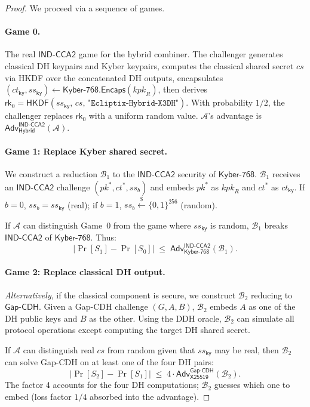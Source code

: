 \documentclass[11pt,a4paper]{article}
\theoremstyle{definition}
\theoremstyle{remark}
\newcommand{\adv}{\mathsf{Adv}}
\newcommand{\advA}{\mathcal{A}}
\newcommand{\advB}{\mathcal{B}}
\newcommand{\HKDF}{\mathsf{HKDF}}
\renewcommand{\DH}{\mathsf{X25519}}
\newcommand{\KEM}{\mathsf{Kyber\text{-}768}}
\newcommand{\Encaps}{\mathsf{Encaps}}
\newcommand{\GapCDH}{\mathsf{Gap\text{-}CDH}}
\newcommand{\INDCCA}{\mathsf{IND\text{-}CCA2}}
\newcommand{\rk}{\mathsf{rk}}
\newcommand{\getsr}{\xleftarrow{\$}}
\newcommand{\bits}{\{0,1\}}
\begin{document}
\begin{proof}
We proceed via a sequence of games.

\paragraph{Game 0.}
The real $\INDCCA$ game for the hybrid combiner.  The challenger generates
classical DH keypairs and Kyber keypairs, computes the classical shared secret
$\mathit{cs}$ via HKDF over the concatenated DH outputs, encapsulates
$(\mathit{ct}_{\mathsf{ky}}, \mathit{ss}_{\mathsf{ky}}) \gets
\KEM.\Encaps(\mathit{kpk}_R)$, then derives
$\rk_0 = \HKDF(\mathit{ss}_{\mathsf{ky}},\, \mathit{cs},\,
\texttt{"Ecliptix-Hybrid-X3DH"})$.  With probability $1/2$, the challenger
replaces $\rk_0$ with a uniform random value.  $\advA$'s advantage is
$\adv^{\INDCCA}_{\mathsf{Hybrid}}(\advA)$.

\paragraph{Game 1: Replace Kyber shared secret.}
We construct a reduction $\advB_1$ to the $\INDCCA$ security of $\KEM$.
$\advB_1$ receives an $\INDCCA$ challenge $(\mathit{pk}^*, \mathit{ct}^*,
\mathit{ss}_b)$ and embeds $\mathit{pk}^*$ as $\mathit{kpk}_R$ and
$\mathit{ct}^*$ as $\mathit{ct}_{\mathsf{ky}}$.  If $b = 0$,
$\mathit{ss}_b = \mathit{ss}_{\mathsf{ky}}$ (real); if $b = 1$,
$\mathit{ss}_b \getsr \bits^{256}$ (random).

If $\advA$ can distinguish Game~0 from the game where $\mathit{ss}_{\mathsf{ky}}$
is random, $\advB_1$ breaks $\INDCCA$ of $\KEM$.  Thus:
\[
  |\Pr[S_1] - \Pr[S_0]| \;\leq\; \adv^{\INDCCA}_{\KEM}(\advB_1).
\]

\paragraph{Game 2: Replace classical DH output.}
\emph{Alternatively}, if the classical component is secure, we construct
$\advB_2$ reducing to $\GapCDH$.  Given a Gap-CDH challenge $(G, A, B)$,
$\advB_2$ embeds $A$ as one of the DH public keys and $B$ as the other.
Using the DDH oracle, $\advB_2$ can simulate all protocol operations except
computing the target DH shared secret.

If $\advA$ can distinguish real $\mathit{cs}$ from random given that
$\mathit{ss}_{\mathsf{ky}}$ may be real, then $\advB_2$ can solve Gap-CDH
on at least one of the four DH pairs:
\[
  |\Pr[S_2] - \Pr[S_1]| \;\leq\; 4 \cdot \adv^{\GapCDH}_{\DH}(\advB_2).
\]
The factor 4 accounts for the four DH computations; $\advB_2$ guesses which
one to embed (loss factor $1/4$ absorbed into the advantage).


\end{proof}
\end{document}
